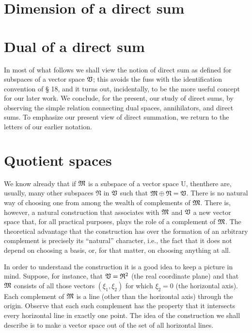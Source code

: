 \section{Dimension of a direct sum}

\section{Dual of a direct sum}

In most of what follows we shall view the notion of direct sum as defined for
subspaces of a vector space \(\mathfrak{V}\); this avoids the fuss with the
identification convention of § 18, and it turns out, incidentally, to be the
more useful concept for our later work. We conclude, for the present, our study
of direct sums, by observing the simple relation connecting dual spaces,
annihilators, and direct sums. To emphasize our present view of direct
summation, we return to the letters of our earlier notation.

\section{Quotient spaces}

We know already that if \(\mathfrak{M}\) is a subspace of a vector space U, thenthere
are, usually, many other subspaces \(\mathfrak{N}\) in \(\mathfrak{V}\) such that
\(\mathfrak{M} \oplus \mathfrak{N} = \mathfrak{V}\). There is no natural way of choosing one
from among the wealth of complements of \(\mathfrak{M}\). There is, however, a natural
construction that associates with \(\mathfrak{M}\) and \(\mathfrak{V}\) a new vector space
that, for all practical purposes, plays the role of a complement of \(\mathfrak{M}\).
The theoretical advantage that the construction has over the formation of an
arbitrary complement is precisely its ``natural'' character, i.e., the fact that
it does not depend on choosing a basis, or, for that matter, on choosing
anything at all.

In order to understand the construction it is a good idea to keep a picture in
mind. Suppose, for instance, that \(\mathfrak{V} = \mathfrak{R}^2\) (the real coordinate
plane) and that \(\mathfrak{M}\) consists of all those vectors \((\xi_1, \xi_2)\) for
which \(\xi_2 = 0\) (the horizontal axis). Each complement of \(\mathfrak{M}\) is a
line (other than the horizontal axis) through the origin. Observe that each such
complement has the property that it intersects every horizontal line in exactly
one point. The idea of the construction we shall describe is to make a vector
space out of the set of all horizontal lines.

